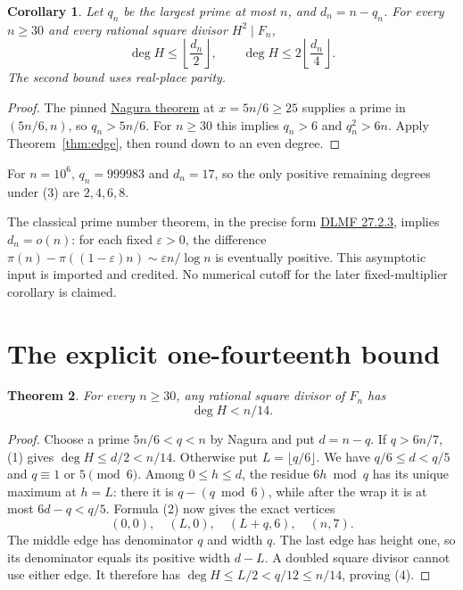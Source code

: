 \documentclass[11pt]{article}
\newtheorem{theorem}{Theorem}
\newtheorem{corollary}[theorem]{Corollary}
\begin{document}
\begin{corollary}\label{cor:gap}
Let $q_n$ be the largest prime at most $n$, and $d_n=n-q_n$.
For every $n\ge30$ and every rational square divisor $H^2\mid F_n$,
\[
 \deg H\le\left\lfloor\frac{d_n}{2}\right\rfloor,
 \qquad \deg H\le2\left\lfloor\frac{d_n}{4}\right\rfloor. \tag{3}
\]
The second bound uses real-place parity.
\end{corollary}
\begin{proof}
The pinned \href{sources/nagura-1952-prime-interval.pdf}{Nagura theorem}
at $x=5n/6\ge25$ supplies a prime in $(5n/6,n)$, so $q_n>5n/6$.
For $n\ge30$ this implies $q_n>6$ and $q_n^2>6n$.
Apply Theorem~\ref{thm:edge}, then round down to an even degree.
\end{proof}
For $n=10^6$, $q_n=999983$ and $d_n=17$, so the only positive
remaining degrees under (3) are $2,4,6,8$.

The classical prime number theorem, in the precise form
\href{https://dlmf.nist.gov/27.2.E3}{DLMF 27.2.3}, implies $d_n=o(n)$:
for each fixed $\varepsilon>0$, the difference
$\pi(n)-\pi((1-\varepsilon)n)\sim\varepsilon n/\log n$ is eventually
positive. This asymptotic input is imported and credited. No numerical
cutoff for the later fixed-multiplier corollary is claimed.

\section{The explicit one-fourteenth bound}
\begin{theorem}\label{thm:fourteenth}
For every $n\ge30$, any rational square divisor of $F_n$ has
\[
 \boxed{\deg H<n/14.} \tag{4}
\]
\end{theorem}
\begin{proof}
Choose a prime $5n/6<q<n$ by Nagura and put $d=n-q$.
If $q>6n/7$, (1) gives $\deg H\le d/2<n/14$.
Otherwise put $L=\lfloor q/6\rfloor$. We have
$q/6\le d<q/5$ and $q\equiv1$ or $5\pmod6$.
Among $0\le h\le d$, the residue $6h\bmod q$ has its unique
maximum at $h=L$: there it is $q-(q\bmod6)$, while after the wrap
it is at most $6d-q<q/5$. Formula (2) now gives the exact vertices
\[
 (0,0),\quad(L,0),\quad(L+q,6),\quad(n,7). \tag{5}
\]
The middle edge has denominator $q$ and width $q$. The last edge
has height one, so its denominator equals its positive width $d-L$.
A doubled square divisor cannot use either edge. It therefore has
$\deg H\le L/2<q/12\le n/14$, proving (4).
\end{proof}
\end{document}
